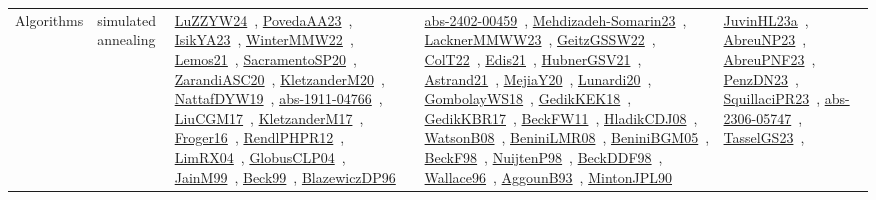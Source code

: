 {\begin{longtable}{lp{3cm}>{\raggedright\arraybackslash}p{6cm}>{\raggedright\arraybackslash}p{6cm}>{\raggedright\arraybackslash}p{8cm}}
Algorithms & simulated annealing & \href{../works/LuZZYW24.pdf}{LuZZYW24}~\cite{LuZZYW24}, \href{../works/PovedaAA23.pdf}{PovedaAA23}~\cite{PovedaAA23}, \href{../works/IsikYA23.pdf}{IsikYA23}~\cite{IsikYA23}, \href{../works/WinterMMW22.pdf}{WinterMMW22}~\cite{WinterMMW22}, \href{../works/Lemos21.pdf}{Lemos21}~\cite{Lemos21}, \href{../works/SacramentoSP20.pdf}{SacramentoSP20}~\cite{SacramentoSP20}, \href{../works/ZarandiASC20.pdf}{ZarandiASC20}~\cite{ZarandiASC20}, \href{../works/KletzanderM20.pdf}{KletzanderM20}~\cite{KletzanderM20}, \href{../works/NattafDYW19.pdf}{NattafDYW19}~\cite{NattafDYW19}, \href{../works/abs-1911-04766.pdf}{abs-1911-04766}~\cite{abs-1911-04766}, \href{../works/LiuCGM17.pdf}{LiuCGM17}~\cite{LiuCGM17}, \href{../works/KletzanderM17.pdf}{KletzanderM17}~\cite{KletzanderM17}, \href{../works/Froger16.pdf}{Froger16}~\cite{Froger16}, \href{../works/RendlPHPR12.pdf}{RendlPHPR12}~\cite{RendlPHPR12}, \href{../works/LimRX04.pdf}{LimRX04}~\cite{LimRX04}, \href{../works/GlobusCLP04.pdf}{GlobusCLP04}~\cite{GlobusCLP04}, \href{../works/JainM99.pdf}{JainM99}~\cite{JainM99}, \href{../works/Beck99.pdf}{Beck99}~\cite{Beck99}, \href{../works/BlazewiczDP96.pdf}{BlazewiczDP96}~\cite{BlazewiczDP96} & \href{../works/abs-2402-00459.pdf}{abs-2402-00459}~\cite{abs-2402-00459}, \href{../works/Mehdizadeh-Somarin23.pdf}{Mehdizadeh-Somarin23}~\cite{Mehdizadeh-Somarin23}, \href{../works/LacknerMMWW23.pdf}{LacknerMMWW23}~\cite{LacknerMMWW23}, \href{../works/GeitzGSSW22.pdf}{GeitzGSSW22}~\cite{GeitzGSSW22}, \href{../works/ColT22.pdf}{ColT22}~\cite{ColT22}, \href{../works/Edis21.pdf}{Edis21}~\cite{Edis21}, \href{../works/HubnerGSV21.pdf}{HubnerGSV21}~\cite{HubnerGSV21}, \href{../works/Astrand21.pdf}{Astrand21}~\cite{Astrand21}, \href{../works/MejiaY20.pdf}{MejiaY20}~\cite{MejiaY20}, \href{../works/Lunardi20.pdf}{Lunardi20}~\cite{Lunardi20}, \href{../works/GombolayWS18.pdf}{GombolayWS18}~\cite{GombolayWS18}, \href{../works/GedikKEK18.pdf}{GedikKEK18}~\cite{GedikKEK18}, \href{../works/GedikKBR17.pdf}{GedikKBR17}~\cite{GedikKBR17}, \href{../works/BeckFW11.pdf}{BeckFW11}~\cite{BeckFW11}, \href{../works/HladikCDJ08.pdf}{HladikCDJ08}~\cite{HladikCDJ08}, \href{../works/WatsonB08.pdf}{WatsonB08}~\cite{WatsonB08}, \href{../works/BeniniLMR08.pdf}{BeniniLMR08}~\cite{BeniniLMR08}, \href{../works/BeniniBGM05.pdf}{BeniniBGM05}~\cite{BeniniBGM05}, \href{../works/BeckF98.pdf}{BeckF98}~\cite{BeckF98}, \href{../works/NuijtenP98.pdf}{NuijtenP98}~\cite{NuijtenP98}, \href{../works/BeckDDF98.pdf}{BeckDDF98}~\cite{BeckDDF98}, \href{../works/Wallace96.pdf}{Wallace96}~\cite{Wallace96}, \href{../works/AggounB93.pdf}{AggounB93}~\cite{AggounB93}, \href{../works/MintonJPL90.pdf}{MintonJPL90}~\cite{MintonJPL90} & \href{../works/JuvinHL23a.pdf}{JuvinHL23a}~\cite{JuvinHL23a}, \href{../works/AbreuNP23.pdf}{AbreuNP23}~\cite{AbreuNP23}, \href{../works/AbreuPNF23.pdf}{AbreuPNF23}~\cite{AbreuPNF23}, \href{../works/PenzDN23.pdf}{PenzDN23}~\cite{PenzDN23}, \href{../works/SquillaciPR23.pdf}{SquillaciPR23}~\cite{SquillaciPR23}, \href{../works/abs-2306-05747.pdf}{abs-2306-05747}~\cite{abs-2306-05747}, \href{../works/TasselGS23.pdf}{TasselGS23}~\cite{TasselGS23}, 
\end{longtable}}
